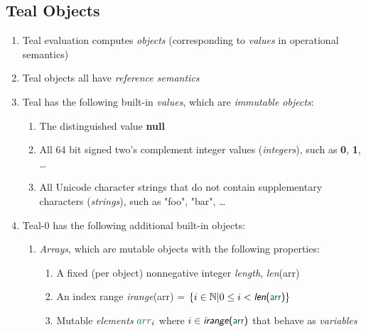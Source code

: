 \documentclass{article}
\newcommand{\Varray}[0]{\textcolor{dcyan}{arr}}
\newcommand{\Vnull}[0]{\textbf{\textcolor{dcyan}{null}}}
\newcommand{\Vint}[1]{{\textsf{\textcolor{dcyan}{\textbf{#1}}}}}
\newcommand{\Vstr}[1]{{\textsf{\textcolor{dcyan}{"#1"}}}}
\newcommand{\arraylength}[1]{\textsf{\textit{len}(#1)}}
\newcommand{\arrayindices}[1]{\textsf{\textit{irange}(#1)}}
\begin{document}
\subsection{Teal Objects}

\begin{enumerate}
\item Teal evaluation computes \emph{objects} (corresponding to \emph{values} in operational semantics)
\item Teal objects all have \emph{reference semantics}
\item Teal has the following built-in \emph{values}, which are \emph{immutable objects}:
  \begin{enumerate}
  \item The distinguished value \Vnull{}
  \item All 64 bit signed two's complement integer values (\emph{integers}), such as \Vint{0}, \Vint{1}, \ldots
  \item All Unicode character strings that do not contain supplementary characters (\emph{strings}), such as \Vstr{foo}, \Vstr{bar}, \ldots
  \end{enumerate}
\item Teal-0 has the following additional built-in objects:
\begin{enumerate}
\item \emph{Arrays}, which are mutable objects with the following properties:
  \begin{enumerate}
  \item A fixed (per object) nonnegative integer \emph{length}, \arraylength{\Varray}
  \item An index range \arrayindices{\Varray} = $\{i \in \mathbb{N} | 0 \le i < \arraylength{\Varray}\}$
  \item Mutable \emph{elements} $\Varray_i$ where $i \in \arrayindices{\Varray}$ that behave as \emph{variables}
  \end{enumerate}
\end{enumerate}
\end{enumerate}
\end{document}
